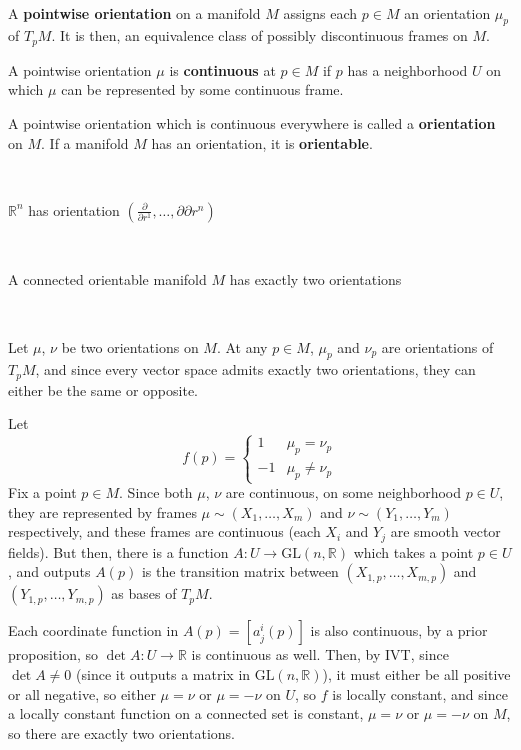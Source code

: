 \documentclass{article}
\begin{document}
\begin{definition}
  \

  A \textbf{pointwise orientation} on a manifold $M$ assigns each $p \in M$ an orientation $\mu_p$ of $T_pM$. It is then, an equivalence class of possibly discontinuous frames on $M$.

  A pointwise orientation $\mu$ is \textbf{continuous} at $p \in M$ if $p$ has a neighborhood $U$ on which $\mu$ can be represented by some continuous frame.

  A pointwise orientation which is continuous everywhere is called a \textbf{orientation} on $M$. If a manifold $M$ has an orientation, it is \textbf{orientable}.
\end{definition}

\begin{example}
  \

  $\mathbb{R}^n$ has orientation $(\frac{\partial}{\partial r^1}, \dots, \partial{\partial r^n})$
\end{example}

\begin{proposition}
  \

  A connected orientable manifold $M$ has exactly two orientations
\end{proposition}

\begin{customproof}
  \

  Let $\mu$, $\nu$ be two orientations on $M$. At any $p \in M$, $\mu_p$ and $\nu_p$ are orientations of $T_pM$, and since every vector space admits exactly two orientations, they can either be the same or opposite.

  Let $$f(p) =
  \begin{cases}
    1 & \mu_p = \nu_p\\
    -1 & \mu_p \neq \nu_p
  \end{cases}$$Fix a point $p \in M$. Since both $\mu$, $\nu$ are continuous, on some neighborhood $p \in U$, they are represented by frames $\mu \sim (X_1, \dots, X_m)$ and $\nu \sim (Y_1, \dots, Y_m)$ respectively, and these frames are continuous (each $X_i$ and $ Y_j$ are smooth vector fields). But then, there is a function $A: U \to \text{GL}(n, \mathbb{R})$ which takes a point $p \in U$, and outputs $A(p)$ is the transition matrix between $(X_{1,p}, \dots, X_{m,p})$ and $(Y_{1,p}, \dots, Y_{m,p})$ as bases of $T_pM$.

  Each coordinate function in $A(p) = [a^i_j(p)]$ is also continuous, by a prior proposition, so $\det A: U \to \mathbb{R}$ is continuous as well. Then, by IVT, since $\det A \neq 0$ (since it outputs a matrix in $\text{GL}(n, \mathbb{R})$), it must either be all positive or all negative, so either $\mu = \nu$ or $\mu = -\nu$ on $U$, so $f$ is locally constant, and since a locally constant function on a connected set is constant, $\mu = \nu$ or $\mu = -\nu$ on $M$, so there are exactly two orientations.
\end{customproof}
\end{document}
